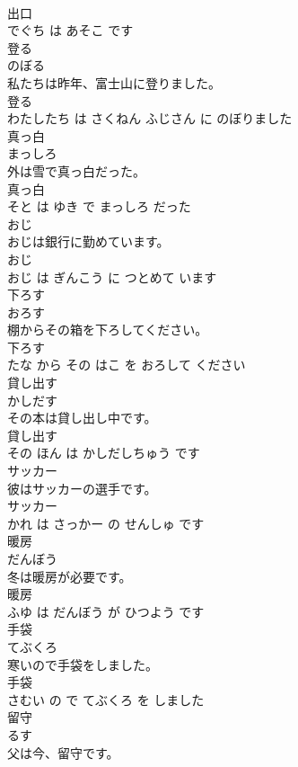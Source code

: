 \documentclass[8pt]{extreport}
\begin{document}
\begin{CJK}{UTF8}{min}
\\	出口 
\\	でぐち は あそこ です			
\\	登る	
\\	のぼる			
\\	私たちは昨年、富士山に登りました。	
\\	登る 
\\	わたしたち は さくねん ふじさん に のぼりました			
\\	真っ白	
\\	まっしろ			
\\	外は雪で真っ白だった。	
\\	真っ白 
\\	そと は ゆき で まっしろ だった			
\\	おじ	
\\	おじは銀行に勤めています。	
\\	おじ 
\\	おじ は ぎんこう に つとめて います			
\\	下ろす	
\\	おろす			
\\	棚からその箱を下ろしてください。	
\\	下ろす 
\\	たな から その はこ を おろして ください			
\\	貸し出す	
\\	かしだす			
\\	その本は貸し出し中です。	
\\	貸し出す 
\\	その ほん は かしだしちゅう です			
\\	サッカー	
\\	彼はサッカーの選手です。	
\\	サッカー 
\\	かれ は さっかー の せんしゅ です			
\\	暖房	
\\	だんぼう			
\\	冬は暖房が必要です。	
\\	暖房 
\\	ふゆ は だんぼう が ひつよう です			
\\	手袋	
\\	てぶくろ			
\\	寒いので手袋をしました。	
\\	手袋 
\\	さむい の で てぶくろ を しました			
\\	留守	
\\	るす			
\\	父は今、留守です。	

\end{CJK}
\end{document}
